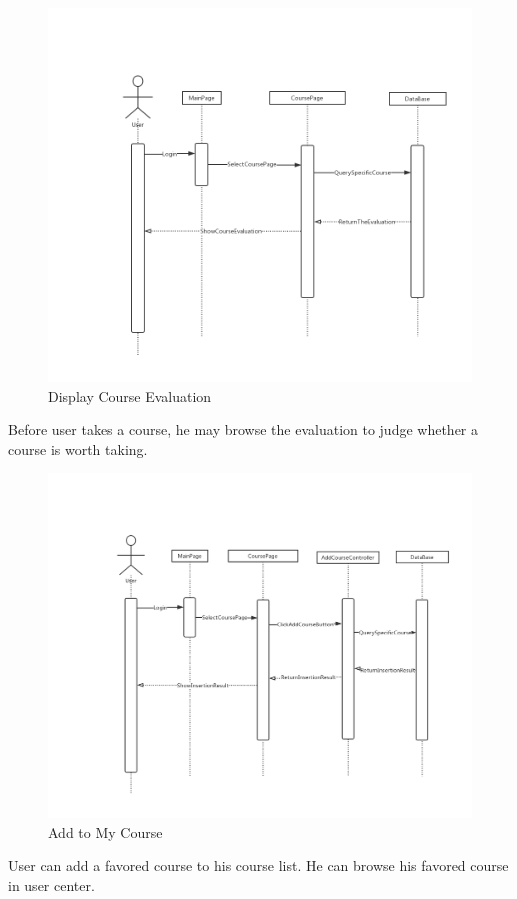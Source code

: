 \documentclass[16pt]{scrreprt}
\begin{document}
\begin{figure}[H]
    \includegraphics[width=\linewidth]{./FuncPhoto/9.png}   
    \caption{Display Course Evaluation}
\end{figure}
Before user takes a course, he may browse the evaluation to judge whether a course is worth taking.


\begin{figure}[H]
    \includegraphics[width=\linewidth]{./FuncPhoto/10.png}   
    \caption{Add to My Course}
\end{figure}
User can add a favored course to his course list. He can browse his favored course in user center.
\end{document}

